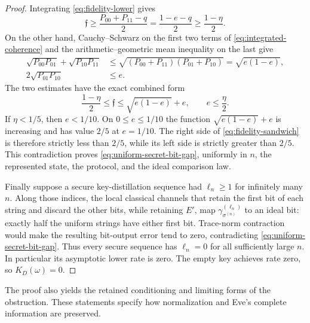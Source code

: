 \begin{proof}
Integrating \eqref{eq:fidelity-lower} gives
\[
 \mathfrak f\ge\frac{P_{00}+P_{11}-q}{2}
 =\frac{1-e-q}{2}\ge\frac{1-\eta}{2}.
\]
On the other hand, Cauchy--Schwarz on the first two terms of
\eqref{eq:integrated-coherence} and the arithmetic--geometric mean
inequality on the last give
\[
 \begin{aligned}
 \sqrt{P_{00}P_{01}}+\sqrt{P_{10}P_{11}}
 &\le\sqrt{(P_{00}+P_{11})(P_{01}+P_{10})}
   =\sqrt{e(1-e)},\\
 2\sqrt{P_{01}P_{10}}&\le e.
 \end{aligned}
\]
The two estimates have the exact combined form
\begin{equation}\label{eq:fidelity-sandwich}
 \frac{1-\eta}{2}\le\mathfrak f\le\sqrt{e(1-e)}+e,
 \qquad e\le\frac\eta2.
\end{equation}
If $\eta<1/5$, then $e<1/10$.  On $0\le e\le1/10$ the function
$\sqrt{e(1-e)}+e$ is increasing and has value $2/5$ at $e=1/10$.
The right side of \eqref{eq:fidelity-sandwich} is therefore strictly
less than $2/5$, while its left side is strictly greater than $2/5$.
This contradiction proves \eqref{eq:uniform-secret-bit-gap},
uniformly in $n$, the represented state, the protocol, and the ideal
comparison law.

Finally suppose a secure key-distillation sequence had $\ell_n\ge1$
for infinitely many $n$.  Along those indices, the local classical channels
that retain the first bit of each string and discard the other bits,
while retaining $E'$, map $\gamma^{(\ell_n)}_{\sigma^{(n)}}$ to an ideal
bit: exactly half the uniform strings have either first bit.
Trace-norm contraction would make the resulting bit-output error tend to
zero, contradicting \eqref{eq:uniform-secret-bit-gap}.  Thus every secure
sequence has $\ell_n=0$ for all sufficiently large $n$.  In particular its
asymptotic lower rate is zero.  The empty key achieves rate zero, so
$K_D(\omega)=0$.
\end{proof}

The proof also yields the retained conditioning and limiting forms of
the obstruction.  These statements specify how normalization and
Eve's complete information are preserved.

